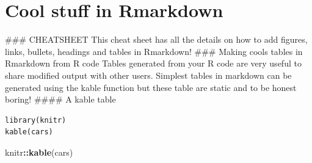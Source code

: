 \documentclass[
]{book}
\newenvironment{Shaded}{\begin{snugshade}}{\end{snugshade}}
\newcommand{\KeywordTok}[1]{\textcolor[rgb]{0.13,0.29,0.53}{\textbf{#1}}}
\newcommand{\NormalTok}[1]{#1}
\newcommand{\OperatorTok}[1]{\textcolor[rgb]{0.81,0.36,0.00}{\textbf{#1}}}
\begin{document}
\hypertarget{cool-stuff-in-rmarkdown}{%
\section{Cool stuff in Rmarkdown}\label{cool-stuff-in-rmarkdown}}

\#\#\# CHEATSHEET
This cheat sheet has all the details on how to add figures, links, bullets, headings and tables in Rmarkdown!
\href{img/rmarkdown-2.0.pdf}{}
\#\#\# Making cools tables in Rmarkdown from R code
Tables generated from your R code are very useful to share modified output with other users.
Simplest tables in markdown can be generated using the kable function but these table are static and to be honest boring!
\#\#\#\# A kable table

\begin{verbatim}
library(knitr)
kable(cars)
\end{verbatim}

\begin{Shaded}
\begin{Highlighting}[]
\NormalTok{knitr}\OperatorTok{::}\KeywordTok{kable}\NormalTok{(cars)}
\end{Highlighting}
\end{Shaded}
\end{document}
